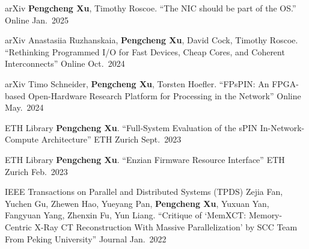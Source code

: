 


\begin{cventries}

  \cventry
    {arXiv}
    {{\normalfont \textbf{Pengcheng Xu}, Timothy Roscoe. ``The NIC should be part of the OS.''}}
    {Online} %
    {Jan.\ 2025} %
    {}

  \cventry
    {arXiv}
    {{\normalfont Anastasiia Ruzhanskaia, \textbf{Pengcheng Xu}, David Cock, Timothy Roscoe. ``Rethinking Programmed I/O for Fast Devices, Cheap Cores, and Coherent Interconnects''}}
    {Online} %
    {Oct.\ 2024} %
    {}

  \cventry
    {arXiv}
    {{\normalfont Timo Schneider, \textbf{Pengcheng Xu}, Torsten Hoefler. ``FPsPIN: An FPGA-based Open-Hardware Research Platform for Processing in the Network''}}
    {Online} %
    {May.\ 2024} %
    {}

  \cventry
    {ETH Library}
    {{\normalfont \textbf{Pengcheng Xu}. ``Full-System Evaluation of the sPIN In-Network-Compute Architecture''}}
    {ETH Zurich} %
    {Sept.\ 2023} %
    {}

  \cventry
    {ETH Library}
    {{\normalfont \textbf{Pengcheng Xu}. ``Enzian Firmware Resource Interface''}}
    {ETH Zurich} %
    {Feb.\ 2023} %
    {}

  \cventry
    {IEEE Transactions on Parallel and Distributed Systems (TPDS)}
    {{\normalfont Zejia Fan, Yuchen Gu, Zhewen Hao, Yueyang Pan, \textbf{Pengcheng Xu}, Yuxuan Yan, Fangyuan Yang, Zhenxin Fu, Yun Liang. ``Critique of `MemXCT: Memory-Centric X-Ray CT Reconstruction With Massive Parallelization' by SCC Team From Peking University''}}
    {Journal} %
    {Jan.\ 2022} %
    {}


\end{cventries}
